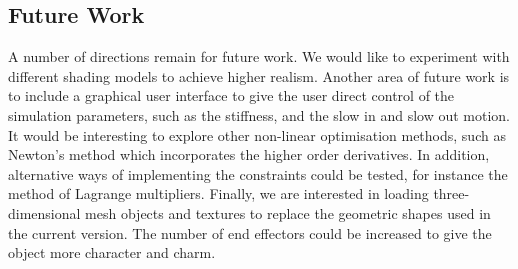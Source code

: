 \documentclass[paper=a4, fontsize=11pt]{scrartcl} %
\numberwithin{equation}{section} %
\numberwithin{figure}{section} %
\numberwithin{table}{section} %
\begin{document}
\subsection{Future Work}

A number of directions remain for future work. We would like to experiment with different shading models to achieve higher realism. Another area of future work is to include a graphical user interface to give the user direct control of the simulation  parameters, such as the stiffness, and the slow in and slow out motion. It would be interesting to explore other non-linear optimisation methods, such as Newton's method which incorporates the higher order derivatives. In addition,  alternative ways of implementing the constraints could be tested, for instance the method of Lagrange multipliers. Finally, we are interested in loading three-dimensional mesh objects and textures to replace the geometric shapes used in the current version. The number of end effectors could be increased to give the object more character and charm. 

\nocite{Fedor2003}
\nocite{Welman1993}
\nocite{Crai55}
{}

\end{document}
